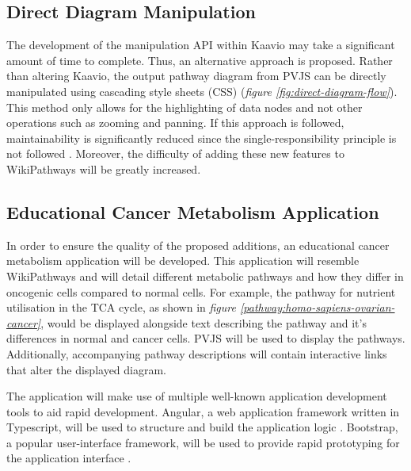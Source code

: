 \documentclass[a4paper,12pt,twoside]{apa}
\begin{document}
\subsection{Direct Diagram Manipulation}
The development of the manipulation API within Kaavio may take a significant amount of time to complete. Thus, an alternative approach is proposed. Rather than altering Kaavio, the output pathway diagram from PVJS can be directly manipulated using cascading style sheets (CSS) (\textit{figure \ref{fig:direct-diagram-flow}}). This method only allows for the highlighting of data nodes and not other operations such as zooming and panning. If this approach is followed,  maintainability is significantly reduced since the single-responsibility principle is not followed \cite{martin2003agile}. Moreover, the difficulty of adding these new features to WikiPathways will be greatly increased.

\FloatBarrier
\subsection{Educational Cancer Metabolism Application}
In order to ensure the quality of the proposed additions, an educational cancer metabolism application will be developed. This application will resemble WikiPathways and will detail different metabolic pathways and how they differ in oncogenic cells compared to normal cells. For example, the pathway for nutrient utilisation in the TCA cycle, as shown in \textit{figure \ref{pathway:homo-sapiens-ovarian-cancer}}, would be displayed alongside text describing the pathway and it's differences in normal and cancer cells.  PVJS will be used to display the pathways. Additionally, accompanying pathway descriptions will contain interactive links that alter the displayed diagram.

The application will make use of multiple well-known application development tools to aid rapid development. Angular, a web application framework written in Typescript, will be used to structure and build the application logic \cite{Angular}. Bootstrap, a popular user-interface framework, will be used to provide rapid prototyping for the application interface \cite{Bootstrap}.
\end{document}
